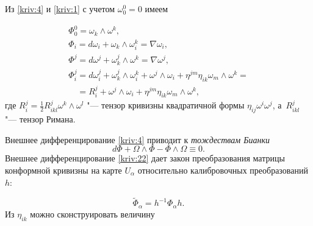 Из \eqref{kriv:4} и \eqref{kriv:1} с учетом $\omega _{0}^{0}=0$ имеем

\begin{equation}

\begin{array}{l}

\Phi _{0}^{0}=\omega _{k}\wedge \omega ^{k},\\ 

\Phi _{i}=d\omega _{i}+\omega _{k}\wedge \omega _{i}^{k}=\nabla \omega _{i},\\ 

\Phi ^{j}=d\omega ^{j}+\omega _{k}^{j}\wedge \omega ^{k}=\nabla \omega ^{j}, \\ 

\Phi _{i}^{j}=d\omega _{i}^{j}+\omega _{k}^{j}\wedge \omega _{i}^{k}+\omega

^{j}\wedge \omega _{i}+\eta ^{jm}\eta _{ik}\omega _{m}\wedge \omega

^{k} = \\

\phantom{\Phi _{i}^{j}}

 =R_{i}^{j}+\omega ^{j}\wedge \omega _{i}+\eta ^{jm}\eta _{ik}\omega

_{m}\wedge \omega ^{k},\end{array}

\label{kriv:7}

\end{equation}где $R_{i}^{j}=\frac{1}{2}R_{ikl}^{j}\omega ^{k}\wedge

\omega ^{l}$ "--- тензор кривизны квадратичной формы $\eta _{ij}\omega ^{i}\omega ^{j}$, \linebreak а~$R_{ikl}^{j}$ "--- тензор Римана.



Внешнее дифференцирование \eqref{kriv:4} приводит к \textit{тождествам Бианки}\begin{equation}

d\Phi +\Omega \wedge \Phi -\Phi \wedge \Omega \equiv 0.  \label{kriv:6}

\end{equation}Внешнее дифференцирование \eqref{kriv:22} дает закон преобразования матрицы конформной кривизны на карте $U_{\alpha

}$ относительно калибровочных преобразований $h$: 

\begin{equation}

\widetilde{\Phi }_{\alpha }=h^{-1}\Phi _{\alpha }h.  \label{kriv:8}

\end{equation}Из $\eta _{ik}$ можно сконструировать величину

